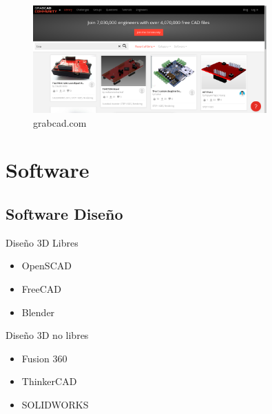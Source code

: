 \documentclass{beamer}
\begin{document}
\begin{frame}
\begin{figure}[h!]
	\centering
	\includegraphics[width=0.8\textwidth]{grabcad.png}
	\caption{grabcad.com}
	\label{grabcad}
\end{figure}
\end{frame}

\section{Software}

\subsection{Software Diseño}

\begin{frame}
	
  \begin{block}{Diseño 3D Libres}
	\begin{itemize}
		\item OpenSCAD
		\item FreeCAD
		\item Blender
	\end{itemize}
  \end{block}

\begin{block}{Diseño 3D no libres}
	\begin{itemize}
		\item Fusion 360
		\item ThinkerCAD
		\item SOLIDWORKS
	\end{itemize}
\end{block}

	
\end{frame}
\end{document}
